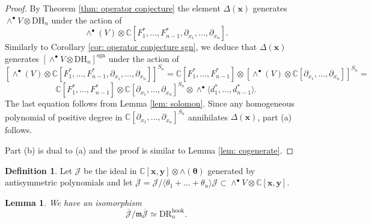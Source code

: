 \documentclass{amsart}
\newcommand{\C}{\mathbb{C}}
\newcommand{\xx}{\mathbf{x}}
\newcommand{\yy}{\mathbf{y}}
\newcommand{\ttheta}{\boldsymbol{\theta}}
\newcommand{\mm}{\mathfrak{m}}
\newcommand{\DR}{\mathrm{DR}}
\renewcommand{\DH}{\mathrm{DH}}
\newcommand{\sgn}{\mathrm{sgn}}
\newcommand{\hook}{\mathrm{hook}}
\newcommand{\cJ}{\mathcal{J}}
\numberwithin{equation}{section}
\newtheorem{lemma}[theorem]{Lemma}
\theoremstyle{definition}
\newtheorem{definition}[theorem]{Definition}
\begin{document}
\begin{proof}
By Theorem \ref{thm: operator conjecture} the element $\Delta(\xx)$ generates $\wedge^{\bullet}V\otimes \DH_n$ under the action of 
$$
\wedge^{\bullet}(V)\otimes \C[F_1^*,\ldots,F_{n-1}^*,\partial_{x_1},\ldots,\partial_{x_n}].
$$
Similarly to Corollary \ref{cor: operator conjecture sgn}, we deduce that $\Delta(\xx)$  generates 
$
\left[\wedge^{\bullet}V\otimes \DH_n\right]^{\sgn}
$
under the action of 
$$
\left[\wedge^{\bullet}(V)\otimes \C[F_1^*,\ldots,F_{n-1}^*,\partial_{x_1},\ldots,\partial_{x_n}]\right]^{S_n}=\C[F_1^*,\ldots,F_{n-1}^*]\otimes \left[\wedge^{\bullet}(V)\otimes\C[\partial_{x_1},\ldots,\partial_{x_n}]\right]^{S_n}=
$$
$$
\C[F_1^*,\ldots,F_{n-1}^*]\otimes \C[\partial_{x_1},\ldots,\partial_{x_n}]^{S_n}\otimes \wedge^{\bullet}\langle d_1^*,\ldots,d_{n-1}^*\rangle.
$$
The last equation follows from Lemma \ref{lem: solomon}. Since any homogeneous polynomial of positive degree in $\C[\partial_{x_1},\ldots,\partial_{x_n}]^{S_n}$ annihilates $\Delta(\xx)$, part (a) follows.

Part (b) is dual to (a) and the proof is similar to Lemma \ref{lem: cogenerate}.
\end{proof}

\begin{definition}
Let $\cJ$ be the ideal in $\C[\xx,\yy]\otimes \wedge(\ttheta)$ generated by antisymmetric polynomials and let $\overline{\cJ}=\cJ/\langle \theta_1+\ldots+\theta_n\rangle \cJ\subset \wedge^{\bullet}V\otimes \C[\xx,\yy]$.
\end{definition}

\begin{lemma}
\label{lem: iota}
We have an isomorphism
$$
\overline{\cJ}/\mm\overline{\cJ}\simeq \DR_n^{\hook}.
$$
\end{lemma}
\end{document}
